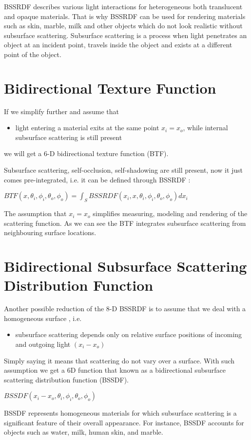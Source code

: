 BSSRDF describes various light interactions for heterogeneous both translucent and opaque materials.
That is why BSSRDF can be used for rendering materials such as skin, marble, milk and other objects which do not look realistic without subsurface scattering. 
Subsurface scattering is a process when light penetrates an object at an incident point, travels inside the object and exists at a different point of the object.

\section{Bidirectional Texture Function}
\label{section:btf}
If we simplify further and assume that

\begin{itemize}
 \item light entering a material exits at the same point $x_{i}=x_{o}$, while internal subsurface scattering is still present
\end{itemize}

we will get a 6-D bidirectional texture function (BTF).

Subsurface scattering, self-occlusion, self-shadowing  are still present, now it just comes pre-integrated, i.e. it can be defined through BSSRDF \cite{star2004}:
 \begin{center}
$ BTF(x,\theta_{i} ,\phi_{i},\theta_{o} ,\phi_{o})=\int_{S}BSSRDF(x_{i},x,\theta_{i} ,\phi_{i},\theta_{o} ,\phi_{o}) dx_{i}$
 \end{center}
  The assumption that $x_{i}=x_{o}$ simplifies measuring, modeling and rendering of the scattering function. 
 As we can see the BTF integrates subsurface scattering from neighbouring surface locations. 

\section{Bidirectional Subsurface Scattering Distribution Function}
\label{section:BSSDF}

Another possible reduction of the 8-D BSSRDF is to assume that we deal with a homogeneous surface \cite{dong}, i.e.
\begin{itemize}
 \item subsurface scattering depends only on relative surface positions of incoming and outgoing light $(x_{i}-x_{o})$
\end{itemize}
  Simply saying it means that scattering do not vary over a surface.
 With such assumption we get a 6D function that known as a bidirectional subsurface scattering
distribution function (BSSDF).
 \begin{center}
$BSSDF(x_{i}-x_{o},\theta_{i} ,\phi_{i},\theta_{o} ,\phi_{o})$
 \end{center}
 BSSDF represents homogeneous materials for which subsurface scattering is a significant feature of their overall appearance.
 For instance, BSSDF accounts for objects such as water, milk, human skin, and marble.


